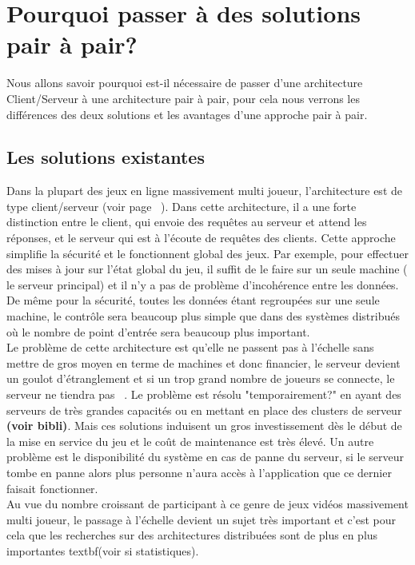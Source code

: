 \section{Pourquoi passer à des solutions pair à pair?}
	\label{whyp2p}
	Nous allons savoir pourquoi est-il nécessaire de passer d'une architecture Client/Serveur à une architecture pair à pair, pour cela nous verrons les différences des deux solutions et les avantages d'une approche pair à pair.
	\subsection{Les solutions existantes}
	Dans la plupart des jeux en ligne massivement multi joueur, l'architecture est de type client/serveur (voir page ~\pageref{P2P/ClServ}). Dans cette architecture, il a une forte distinction entre le client, qui envoie des requêtes au serveur et attend les réponses, et le serveur qui est à l'écoute de requêtes des clients. Cette approche simplifie la sécurité et le fonctionnent global des jeux. Par exemple, pour effectuer des mises à jour sur l'état global du jeu, il suffit de le faire sur un seule machine ( le serveur principal) et il n'y a pas de problème d'incohérence entre les données. De même pour la sécurité, toutes les données étant regroupées sur une seule machine, le contrôle sera beaucoup plus simple que dans des systèmes distribués où le nombre de point d'entrée sera beaucoup plus important. \\
	Le problème de cette architecture est qu'elle ne passent pas à l'échelle sans mettre de gros moyen en terme de machines et donc financier, le serveur devient un goulot d'étranglement et si un trop grand nombre de joueurs se connecte, le serveur ne tiendra pas ~\cite{1198269}. Le problème est résolu "temporairement?" en ayant des serveurs de très grandes capacités ou en mettant en place des clusters de serveur \textbf{(voir bibli)}. Mais ces solutions induisent un gros investissement dès le début de la mise en service du jeu et le coût de maintenance est très élevé. Un autre problème est le disponibilité du système en cas de panne du serveur, si le serveur tombe en panne alors plus personne n'aura accès à l'application que ce dernier faisait fonctionner. \\
	Au vue du nombre croissant de participant à ce genre de jeux vidéos massivement multi joueur, le passage à l'échelle devient un sujet très important et c'est pour cela que les recherches sur des architectures distribuées sont de plus en plus importantes textbf{(voir si statistiques)}. \\
